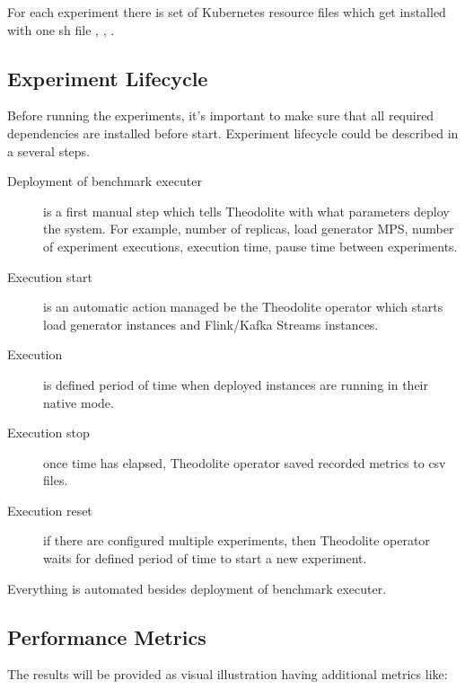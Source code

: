 For each experiment there is set of Kubernetes resource files which get installed
with one sh file \cite{theodolite_framework}, \cite{applications_benhcmarks},
\cite{scalability_frameworks}.

\subsection{Experiment Lifecycle}\label{subsec:experiment-lifecycle}
Before running the experiments, it's important to make sure that all required
dependencies are installed before start.
Experiment lifecycle could be described in a several steps.

\begin{description}
    \item[Deployment of benchmark executer] is a first manual step which tells Theodolite
    with what parameters deploy the system.
    For example, number of replicas, load generator MPS, number of experiment executions,
    execution time, pause time between experiments.
    \item[Execution start] is an automatic action managed be the Theodolite operator which starts
    load generator instances and Flink/Kafka Streams instances.
    \item[Execution] is defined period of time when deployed instances are running in their
    native mode.
    \item[Execution stop] once time has elapsed, Theodolite operator saved recorded metrics to csv files.
    \item[Execution reset] if there are configured multiple experiments, then
    Theodolite operator waits for defined period of time to start a new experiment.
\end{description}

Everything is automated besides deployment of benchmark executer.

\subsection{Performance Metrics}\label{subsec:performance-metrics}

The results will be provided as visual illustration having additional metrics like:

